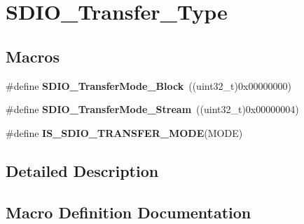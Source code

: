 \hypertarget{group___s_d_i_o___transfer___type}{}\section{S\+D\+I\+O\+\_\+\+Transfer\+\_\+\+Type}
\label{group___s_d_i_o___transfer___type}
\subsection*{Macros}
\begin{DoxyCompactItemize}
\item 
\hypertarget{group___s_d_i_o___transfer___type_ga5b54ada18cc4072ceff1d98ee4b69972}{}\#define {\bfseries S\+D\+I\+O\+\_\+\+Transfer\+Mode\+\_\+\+Block}~((uint32\+\_\+t)0x00000000)\label{group___s_d_i_o___transfer___type_ga5b54ada18cc4072ceff1d98ee4b69972}

\item 
\hypertarget{group___s_d_i_o___transfer___type_gadd0cafe0a80e6b6cc5c22d838cbb2e28}{}\#define {\bfseries S\+D\+I\+O\+\_\+\+Transfer\+Mode\+\_\+\+Stream}~((uint32\+\_\+t)0x00000004)\label{group___s_d_i_o___transfer___type_gadd0cafe0a80e6b6cc5c22d838cbb2e28}

\item 
\#define {\bfseries I\+S\+\_\+\+S\+D\+I\+O\+\_\+\+T\+R\+A\+N\+S\+F\+E\+R\+\_\+\+M\+O\+D\+E}(M\+O\+D\+E)
\end{DoxyCompactItemize}


\subsection{Detailed Description}


\subsection{Macro Definition Documentation}
\hypertarget{group___s_d_i_o___transfer___type_gaf7565ea93f9ed01558bdc9ad80dac763}{}
